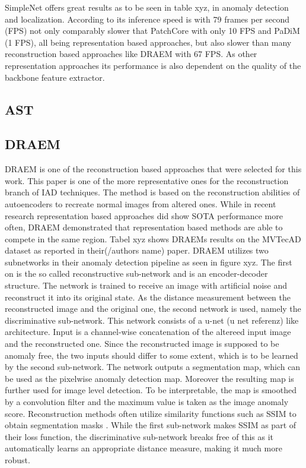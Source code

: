 SimpleNet offers great results as to be seen in table xyz, in anomaly detection and localization. According to \cite{liu2023simplenet} its inference speed is with 79 frames per second (FPS) 
not only comparably slower that PatchCore \cite{patchCore2022} with only 10 FPS 
and PaDiM \cite{Defard_2021PADIM} (1 FPS), all being representation based approaches, but also slower than many reconstruction based approaches like DRAEM with 67 FPS. As other representation 
approaches its performance is also dependent on the quality of the backbone feature extractor.


\subsection{AST}
\label{subsec:AST}

\subsection{DRAEM}
\label{subsec:DRAEM}

DRAEM \cite{Zavrtanik_2021DRAEM} is one of the reconstruction based approaches that were selected for this work. This paper is one of the more representative ones for the reconstruction branch of 
IAD techniques. The method is based on the reconstruction abilities of autoencoders to recreate normal images from altered ones. While in recent research representation based approaches did 
show SOTA performance more often, DRAEM demonstrated that representation based methods are able to compete in the same region. Tabel xyz shows DRAEMs results on the MVTecAD dataset as reported 
in their(/authors name) paper.\newline
DRAEM utilizes two subnetworks in their anomaly detection pipeline as seen in figure xyz. The first on is the so called reconstructive sub-network and is an encoder-decoder structure. The network is trained 
to receive an image with artificial noise and reconstruct it into its original state. As the distance measurement between the reconstructed image and the original one, the second network is used, 
namely the discriminative sub-network. This network consists of a u-net (u net referenz) like architecture. Input is a channel-wise concatenation of the altereed input image and the reconstructed 
one. Since the reconstructed image is supposed to be anomaly free, the two inputs should differ to some extent, which is to be learned by the second sub-network. The network outputs a segmentation map, 
which can be used as the pixelwise anomaly detection map. Moreover the resulting map is further used for image level detection. To be interpretable, the map is smoothed by a convolution filter 
and the maximum value is taken as the image anomaly score. Reconstruction methods often utilize similarity functions such as SSIM \cite{Wang_2004SSIM} to obtain segmentation masks \cite{Zavrtanik_2021DRAEM} 
\cite{liu2024deep}. While the first 
sub-network makes SSIM as part of their loss function, the discriminative sub-network breaks free of this as it automatically learns an appropriate distance measure, making it much more robust.

